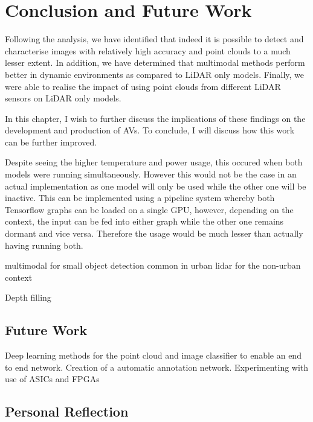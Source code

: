 %
%
\let\textcircled=\pgftextcircled
\chapter{Conclusion and Future Work}
\label{chap:fw}

Following the analysis, we have identified that indeed it is possible to detect and characterise images with relatively high accuracy and point clouds to a much lesser extent. In addition, we have determined that multimodal methods perform better in dynamic environments as compared to LiDAR only models. Finally, we were able to realise the impact of using point clouds from different LiDAR sensors on LiDAR only models. 

In this chapter, I wish to further discuss the implications of these findings on the development and production of AVs. To conclude, I will discuss how this work can be further improved. 

Despite seeing the higher temperature and power usage, this occured when both models were running simultaneously. However this would not be the case in an actual implementation as one model will only be used while the other one will be inactive. This can be implemented using a pipeline system whereby both Tensorflow graphs can be loaded on a single GPU, however, depending on the context, the input can be fed into  either graph while the other one remains dormant and vice versa. Therefore the usage would be much lesser than actually having running both. 



multimodal for small object detection  common in urban
lidar for the non-urban context 

Depth filling 



\section{Future Work}
Deep learning methods for the point cloud and image classifier to enable an end to end network. 
Creation of a automatic annotation network. 
Experimenting with use of ASICs and FPGAs 





\section{Personal Reflection}

